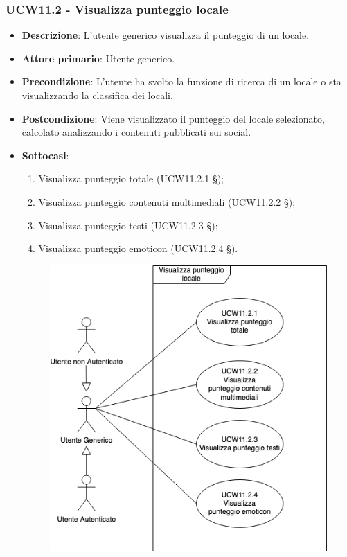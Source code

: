 \subsubsection{UCW11.2 - Visualizza punteggio locale}
\begin{itemize}
    \item \textbf{Descrizione}: L'utente generico visualizza il punteggio di un locale.
    \item \textbf{Attore primario}: Utente generico.
    \item \textbf{Precondizione}: L'utente ha svolto la funzione di ricerca di un locale o sta visualizzando la classifica dei locali.
    \item \textbf{Postcondizione}: Viene visualizzato il punteggio del locale selezionato, calcolato analizzando i contenuti pubblicati sui social.
    \item \textbf{Sottocasi}:
	\begin{enumerate}
		\item Visualizza punteggio totale (UCW11.2.1 \S{});
		\item Visualizza punteggio contenuti multimediali (UCW11.2.2 \S{});
		\item Visualizza punteggio testi (UCW11.2.3 \S{});
		\item Visualizza punteggio emoticon (UCW11.2.4 \S{}).
	\end{enumerate}
	\begin{figure}[H]
	\centering
	\includegraphics[scale=0.5]{UC_images/UCW11-2.png} 

\end{figure}
\end{itemize}
